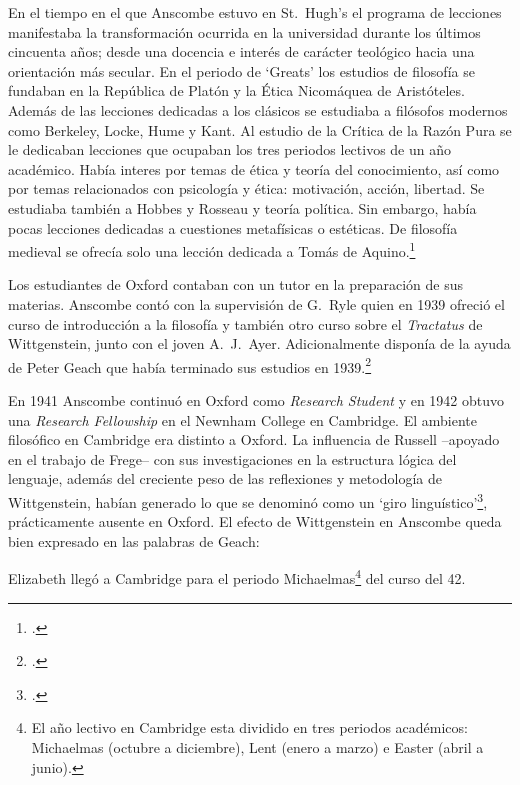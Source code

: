   En el tiempo en el que Anscombe estuvo en St.~Hugh's el programa de lecciones
  manifestaba la transformación ocurrida en la universidad durante los últimos
  cincuenta años; desde una docencia e interés de carácter teológico hacia una
  orientación más secular. En el periodo de `Greats' los estudios de filosofía se
  fundaban en la República de Platón y la Ética Nicomáquea de Aristóteles. Además
  de las lecciones dedicadas a los clásicos se estudiaba a filósofos modernos como
  Berkeley, Locke, Hume y Kant. Al estudio de la Crítica de la Razón Pura se le
  dedicaban lecciones que ocupaban los tres periodos lectivos de un año académico.
  Había interes por temas de ética y teoría del conocimiento, así como por temas
  relacionados con psicología y ética: motivación, acción, libertad. Se estudiaba
  también a Hobbes y Rosseau y teoría política. Sin embargo, había pocas lecciones
  dedicadas a cuestiones metafísicas o estéticas. De filosofía medieval se ofrecía
  solo una lección dedicada a Tomás de Aquino.\footcite[cf.~][pp.~23-24]{accint}

  Los estudiantes de Oxford contaban con un tutor en la preparación de sus
  materias. Anscombe contó con la supervisión de G.~Ryle quien en 1939 ofreció el
  curso de introducción a la filosofía y también otro curso sobre el
  \emph{Tractatus} de Wittgenstein, junto con el joven A.~J.~Ayer. Adicionalmente
  disponía de la ayuda de Peter Geach que había terminado sus estudios en
  1939.\footcite[cf.~][p.~24]{accint}

  En 1941 Anscombe continuó en Oxford como \emph{Research Student} y en 1942
  obtuvo una \emph{Research Fellowship} en el Newnham College en Cambridge. El
  ambiente filosófico en Cambridge era distinto a Oxford. La influencia de Russell
  --apoyado en el trabajo de Frege-- con sus investigaciones en la estructura
  lógica del lenguaje, además del creciente peso de las reflexiones y metodología
  de Wittgenstein, habían generado lo que se denominó como un `giro
  linguístico'\footcite[cf.~][p.14]{phiaut}, prácticamente ausente en Oxford. El
  efecto de Wittgenstein en Anscombe queda bien expresado en las palabras de
  Geach: 

  Elizabeth llegó a Cambridge para el periodo Michaelmas\footnote{El año lectivo
    en Cambridge esta dividido en tres periodos académicos: Michaelmas (octubre a
    diciembre), Lent (enero a marzo) e Easter (abril a junio).} del curso del 42.

